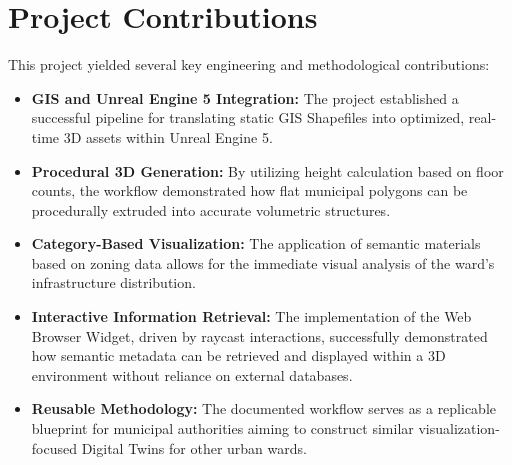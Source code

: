 \section{Project Contributions}
This project yielded several key engineering and methodological contributions:
\begin{itemize}
    \item \textbf{GIS and Unreal Engine 5 Integration:} The project established a successful pipeline for translating static GIS Shapefiles into optimized, real-time 3D assets within Unreal Engine 5.
    \item \textbf{Procedural 3D Generation:} By utilizing height calculation based on floor counts, the workflow demonstrated how flat municipal polygons can be procedurally extruded into accurate volumetric structures.
    \item \textbf{Category-Based Visualization:} The application of semantic materials based on zoning data allows for the immediate visual analysis of the ward's infrastructure distribution.
    \item \textbf{Interactive Information Retrieval:} The implementation of the Web Browser Widget, driven by raycast interactions, successfully demonstrated how semantic metadata can be retrieved and displayed within a 3D environment without reliance on external databases.
    \item \textbf{Reusable Methodology:} The documented workflow serves as a replicable blueprint for municipal authorities aiming to construct similar visualization-focused Digital Twins for other urban wards.
\end{itemize}

